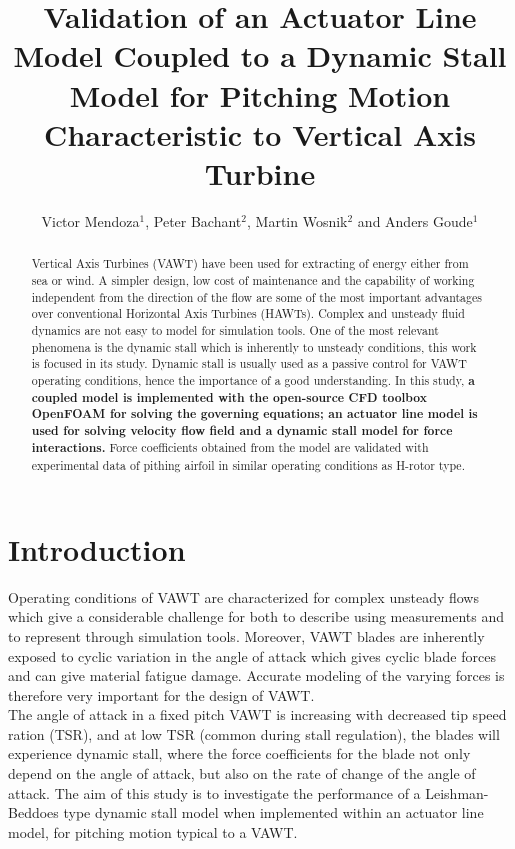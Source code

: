\documentclass[a4paper]{jpconf}
\begin{document}
\title{Validation of an Actuator Line Model Coupled to a Dynamic Stall Model for Pitching Motion Characteristic to Vertical Axis Turbine} %
\author{Victor Mendoza$^{1}$, Peter Bachant$^{2}$, Martin Wosnik$^{2}$ and Anders Goude$^{1}$ }
\address{$^{1}$ Department of Engineering Sciences, Division of Electricity, Uppsala University, \\Uppsala 751 21, Sweden}
\address{$^{2}$ Center for Ocean Renewable Energy, University of New Hampshire, 24 Colovos Rd.,\\ Durham, NH 03824, USA}




\begin{abstract}
Vertical Axis Turbines (VAWT) have been used for extracting of energy either from sea or wind. A simpler design, low cost of maintenance and the capability of working independent from the direction of the flow are some of the most important advantages over conventional Horizontal Axis Turbines (HAWTs). Complex and unsteady fluid dynamics are not easy to model for simulation tools. One of the most relevant phenomena is the dynamic stall which is inherently to unsteady conditions, this work is focused in its study.
Dynamic stall is usually used as a passive control for VAWT operating conditions, hence the importance of a good understanding. In this study, \textbf{a coupled model is implemented with the open-source CFD toolbox OpenFOAM for solving the governing equations; an actuator line model is used for solving velocity flow field and a dynamic stall model for force interactions.} Force coefficients obtained from the model are validated with experimental data of pithing airfoil in similar operating conditions as H-rotor type.
\end{abstract}



\section{Introduction}
Operating conditions of VAWT are characterized for complex unsteady flows which give a considerable challenge for both to describe using measurements and to represent through simulation tools\cite{huyer1996unsteady}. Moreover, VAWT blades are inherently exposed to cyclic variation in the angle of attack which gives cyclic blade forces and can give material fatigue damage. Accurate modeling of the varying forces is therefore very important for the design of VAWT.\\
The angle of attack in a fixed pitch VAWT is increasing with decreased tip speed ration (TSR), and at low TSR (common during stall regulation), the blades will experience dynamic stall, where the force coefficients for the blade not only depend on the angle of attack, but also on the rate of change of the angle of attack. The aim of this study is to investigate the performance of a Leishman-Beddoes type dynamic stall model when implemented within an actuator line model, for pitching motion typical to a VAWT.
\end{document}
